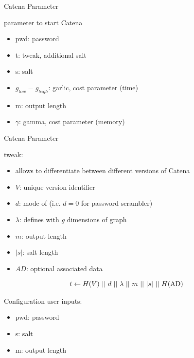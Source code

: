 \documentclass[11pt,aspectratio=169]{beamer}
\begin{document}
\begin{frame}{Catena Parameter}
  \begin{minipage}[H]{0.55\linewidth}
    parameter to start Catena
    \begin{itemize}
      \item pwd: password
      \item t: tweak, additional salt
      \item s: salt
      \item $g_{low}=g_{high}$: garlic, cost parameter (time)
      \item m: output length
      \item $\gamma$: gamma, cost parameter (memory)
    \end{itemize}
  \end{minipage}
  \hfill
  \begin{minipage}[H]{0.4\linewidth}
    \pscatena
  \end{minipage}
\end{frame}

\begin{frame}{Catena Parameter}
  \begin{minipage}[H]{0.55\linewidth}
    tweak:
    \begin{itemize}
      \item allows to differentiate between different versions of Catena
      \item $V$: unique version identifier
      \item $d$: mode of \pw (i.e. $d=0$ for password scrambler)
      \item $\lambda$: defines with $g$ dimensions of graph
      \item $m$: output length
      \item $|s|$: salt length
      \item $AD$: optional associated data
    \end{itemize}
  \end{minipage}
  \hfill
  \begin{minipage}[H]{0.4\linewidth}
    \[
      t \gets H(V) \ ||\  d\ ||\ \lambda \ ||\  m \ ||\  |s| \ ||\  H(\mbox{AD})
    \]
  \end{minipage}
\end{frame}

\begin{frame}{Configuration}
  user inputs:
  \begin{itemize}
    \item pwd: password
    \item s: salt
    \item m: output length
  \end{itemize}
\end{frame}
\end{document}
